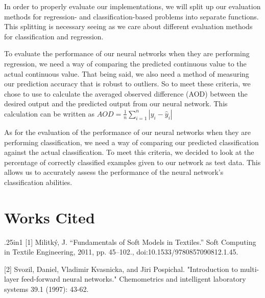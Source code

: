 \documentclass{article}
\begin{document}
In order to properly evaluate our implementations, we will split up our evaluation methods for regression- and classification-based problems into separate functions. This splitting is necessary seeing as we care about different evaluation methods for classification and regression.

To evaluate the performance of our neural networks when they are performing regression, we need a way of comparing the predicted continuous value to the actual continuous value. That being said, we also need a method of measuring our prediction accuracy that is robust to outliers. So to meet these criteria, we chose to use to calculate the averaged observed difference (AOD) between the desired output and the predicted output from our neural network. This calculation can be written as $AOD = \frac{1}{n} \sum_{i=1}^n | y_i - \hat{y}_i|$

As for the evaluation of the performance of our neural networks when they are performing classification, we need a way of comparing our predicted classification against the actual classification. To meet this criteria, we decided to look at the percentage of correctly classified examples given to our network as test data. This allows us to accurately assess the performance of the neural network's classification abilities.

\section{Works Cited}
\begin{hangparas}{.25in}{1}
[1] Militký, J. “Fundamentals of Soft Models in Textiles.” Soft Computing in Textile Engineering, 2011, pp. 45–102., doi:10.1533/9780857090812.1.45.

[2] Svozil, Daniel, Vladimir Kvasnicka, and Jiri Pospichal. "Introduction to multi-layer feed-forward neural networks." Chemometrics and intelligent laboratory systems 39.1 (1997): 43-62.

\end{hangparas}
\end{document}
